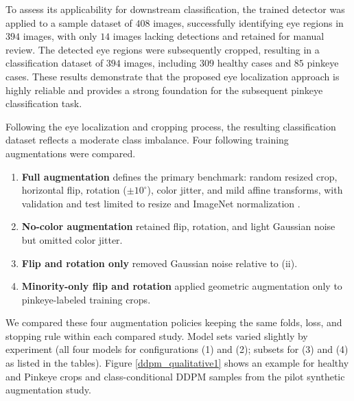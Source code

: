 \documentclass[preprint,12pt,authoryear]{elsarticle}
\begin{document}
To assess its applicability for downstream classification, the trained detector was applied to a sample dataset of $408$ images, successfully identifying eye regions in $394$ images, with only $14$ images lacking detections and retained for manual review. The detected eye regions were subsequently cropped, resulting in a classification dataset of $394$ images, including $309$ healthy cases and $85$ pinkeye cases. These results demonstrate that the proposed eye localization approach is highly reliable and provides a strong foundation for the subsequent pinkeye classification task.
%
%

Following the eye localization and cropping process, the resulting classification dataset reflects a moderate class imbalance. Four following training augmentations were compared. 
\begin{enumerate}
\item \textbf{Full augmentation} defines the primary benchmark: random resized crop, horizontal flip, rotation ($\pm 10^{\circ}$), color jitter, and mild affine transforms, with validation and test limited to resize and ImageNet normalization \cite{rw2019timm}.
\item  \textbf{No-color augmentation} retained flip, rotation, and light Gaussian noise but omitted color jitter.
\item \textbf{Flip and rotation only} removed Gaussian noise relative to (ii). 
\item \textbf{Minority-only flip and rotation} applied geometric augmentation only to pinkeye-labeled training crops.
\end{enumerate}
We compared these four augmentation policies keeping the same folds, loss, and stopping rule within each compared study. Model sets varied slightly by experiment (all four models for configurations (1) and (2); subsets for (3) and (4) as listed in the tables). Figure \ref{ddpm_qualitative1} shows an example for healthy and Pinkeye crops and class-conditional DDPM samples from the pilot synthetic augmentation study.
\end{document}
